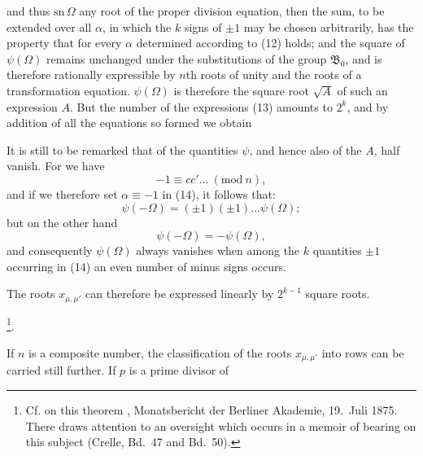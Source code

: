 
and thus $\mathrm{sn}\,\Omega$ any root of the proper division equation, then the sum, to be
extended over all $\alpha$,
in which the $k$ signs of $\pm 1$ may be chosen arbitrarily, has the property that for every
$\alpha$ determined according to (12)
holds; and the square of $\psi(\Omega)$ remains unchanged under the substitutions of the group
$\mathfrak{B}_0$, and is therefore rationally expressible by $n$th roots of unity and the roots
of a transformation equation. $\psi(\Omega)$ is therefore the square root $\sqrt{A}$ of such an
expression $A$. But the number of the expressions (13) amounts to $2^k$, and by addition of all
the equations so formed we obtain

It is still to be remarked that of the quantities $\psi$, and hence also of the $A$, half
vanish. For we have
\[
-1 \equiv cc' \ldots \ (\mathrm{mod}\ n),
\]
and if we therefore set $\alpha \equiv -1$ in (14), it follows that:
\[
\psi(-\Omega) = (\pm 1)(\pm 1)\ldots\psi(\Omega);
\]
but on the other hand
\[
\psi(-\Omega) = -\psi(\Omega),
\]
and consequently $\psi(\Omega)$ always vanishes when among the $k$ quantities $\pm 1$ occurring
in (14) an even number of minus signs occurs.

The roots $x_{\mu,\mu'}$ can therefore be expressed linearly by $2^{k-1}$ square roots.

\footnote{Cf. on this
theorem , Monatsbericht der Berliner Akademie, 19.\ Juli 1875. There  draws
attention to an oversight which occurs in a memoir of  bearing on this subject (Crelle,
Bd.\ 47 and Bd.\ 50).}.

If $n$ is a composite number, the classification of the roots $x_{\mu,\mu'}$ into rows can be
carried still further. If $p$ is a prime divisor of
